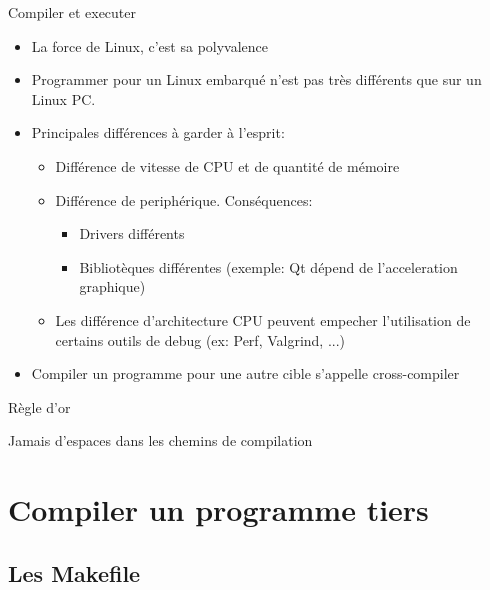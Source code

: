 \begin{frame}{Compiler et executer}
  \begin{itemize}
  \item La force de Linux, c'est sa polyvalence
  \item Programmer  pour un Linux  embarqué n'est pas  très différents
    que sur un Linux PC.
  \item Principales différences à garder à l'esprit:
    \begin{itemize}
    \item Différence de vitesse de CPU et de quantité de mémoire
    \item Différence de periphérique. Conséquences:
      \begin{itemize}
      \item Drivers différents
      \item   Bibliotèques   différentes   (exemple:  Qt   dépend   de
        l'acceleration graphique)
      \end{itemize}
    \item   Les  différence   d'architecture   CPU  peuvent   empecher
      l'utilisation de certains outils de debug (ex: Perf, Valgrind, ...)
    \end{itemize}
  \item  Compiler   un  programme  pour  une   autre  cible  s'appelle
    cross-compiler
  \end{itemize}
\end{frame}

\begin{frame}[fragile=singleslide]{Règle d'or}
  \begin{center}
    \huge{Jamais d'espaces dans les chemins de compilation}
  \end{center}
\end{frame}

\section{Compiler un programme tiers}

\subsection{Les Makefile}

